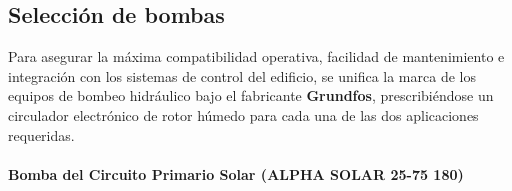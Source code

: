 \documentclass[12pt]{article}
\begin{document}
\subsection{Selección de bombas}
\label{subsec:seleccion_de_bombas}

Para asegurar la máxima compatibilidad operativa, facilidad de mantenimiento e integración con los sistemas de control del edificio, se unifica la marca de los equipos de bombeo hidráulico bajo el fabricante \textbf{Grundfos}, prescribiéndose un circulador electrónico de rotor húmedo para cada una de las dos aplicaciones requeridas.

\paragraph{Bomba del Circuito Primario Solar (ALPHA SOLAR 25-75 180)}
\label{par:bomba_primario}
\end{document}
